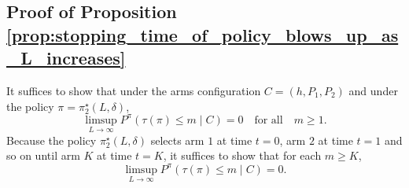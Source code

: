 \subsection{Proof of Proposition \ref{prop:stopping_time_of_policy_blows_up_as_L_increases}}
\label{appndx:proof_of_prop_stopping_time_of_policy_blows_up_as_L_increases}
It suffices to show that under the arms configuration $C=(h, P_1, P_2)$ and under the policy $\pi=\pi_2^\star(L, \delta)$,
\begin{equation}
	\limsup\limits_{L\to \infty} P^\pi(\tau(\pi)\leq m \mid C)=0 \quad \text{for all} \quad m\geq 1.
	\label{eq:proof_of_stopping_time_blowing_up_1}
\end{equation}
Because the policy $\pi_2^\star(L,\delta)$ selects arm $1$ at time $t=0$, arm $2$ at time $t=1$ and so on until arm $K$ at time $t=K$, it suffices to show that for each $m\geq K$,
\begin{equation}
	\limsup\limits_{L \to \infty} P^\pi(\tau(\pi) \leq m \mid C)=0.
	\label{eq:proof_of_stopping_time_blowing_up_2}
\end{equation}
